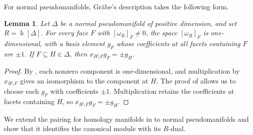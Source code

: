 \documentclass[a4paper,11pt]{amsart}
\theoremstyle{plain}
\newtheorem{lemma}[theorem]{Lemma}
\theoremstyle{definition}
\theoremstyle{remark}
\newcommand{\kk}{\Bbbk}
\begin{document}
For normal pseudomanifolds, Gr\"abe's description takes the following form.

\begin{lemma}\label{lem:link-cycles}
Let $\Delta$ be a normal pseudomanifold of positive dimension, and set $R=\kk[\Delta]$. For every face $F$ with $[\omega_R]_F\ne0$, the space $[\omega_R]_F$ is one-dimensional, with a basis element $g_F$ whose coefficients at all facets containing $F$ are $\pm1$. If $F\subseteq H\in\Delta$, then $x_{H\setminus F}g_F=\pm g_H$.
\end{lemma}
\begin{proof}
By \cite[Lemma~3.2]{MV}, each nonzero component is one-dimensional, and multiplication by $x_{H\setminus F}$ gives an isomorphism to the component at $H$. The proof of \cite[Lemma~2.5]{MV} allows us to choose each $g_F$ with coefficients $\pm1$. Multiplication retains the coefficients at facets containing $H$, so $x_{H\setminus F}g_F=\pm g_H$.
\end{proof}

We extend the pairing for homology manifolds in \cite[proof of Proposition~3.9]{MV} to normal pseudomanifolds and show that it identifies the canonical module with its $R$-dual.
\end{document}
